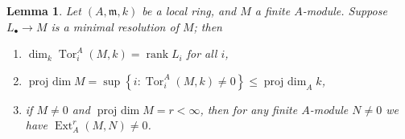 \documentclass[12pt]{article}
\theoremstyle{thmstyle}
\newtheorem{lemma}[theorem]{Lemma}
\theoremstyle{defstyle}
\newcommand{\Tor}{\operatorname{Tor}}
\newcommand{\frakm}{\mathfrak{m}} %
\renewcommand{\le}{\leqslant}
\newcommand{\rank}{\operatorname{rank}}
\newcommand{\Ext}{\operatorname{Ext}}
\newcommand{\projdim}{\operatorname{proj~dim}}
\begin{document}
\begin{lemma}
    Let $(A,\frakm, k)$ be a local ring, and $M$ a finite $A$-module. Suppose $L_\bullet\to M$ is a minimal resolution of $M$; then 
    \begin{enumerate}[label=(\alph*)]
        \item $\dim_k \Tor^A_i(M, k) = \rank L_i$ for all $i$, 
        \item $\projdim M = \sup\left\{i\colon\Tor^A_i(M, k)\ne 0\right\}\le\projdim_A k$,
        \item if $M\ne 0$ and $\projdim M = r < \infty$, then for any finite $A$-module $N\ne 0$ we have $\Ext^r_A(M, N)\ne 0$.
    \end{enumerate}
\end{lemma}
\end{document}
